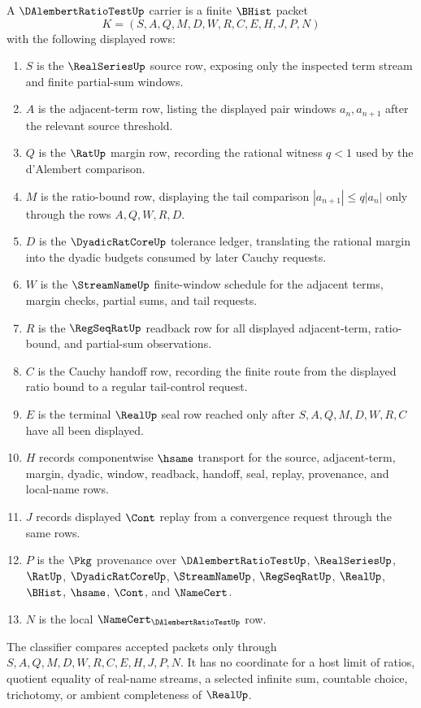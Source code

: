 \begin{definition}
\label{def:dalembert-ratio-test-carrier}
A $\DAlembertRatioTestUp$ carrier is a finite $\BHist$ packet
$$
K=(S,A,Q,M,D,W,R,C,E,H,J,P,N)
$$
with the following displayed rows:
\begin{enumerate}
\item $S$ is the $\RealSeriesUp$ source row, exposing only the inspected term stream and finite partial-sum windows.
\item $A$ is the adjacent-term row, listing the displayed pair windows $a_n,a_{n+1}$ after the relevant source threshold.
\item $Q$ is the $\RatUp$ margin row, recording the rational witness $q<1$ used by the d'Alembert comparison.
\item $M$ is the ratio-bound row, displaying the tail comparison $|a_{n+1}| \leq q|a_n|$ only through the rows $A,Q,W,R,D$.
\item $D$ is the $\DyadicRatCoreUp$ tolerance ledger, translating the rational margin into the dyadic budgets consumed by later Cauchy requests.
\item $W$ is the $\StreamNameUp$ finite-window schedule for the adjacent terms, margin checks, partial sums, and tail requests.
\item $R$ is the $\RegSeqRatUp$ readback row for all displayed adjacent-term, ratio-bound, and partial-sum observations.
\item $C$ is the Cauchy handoff row, recording the finite route from the displayed ratio bound to a regular tail-control request.
\item $E$ is the terminal $\RealUp$ seal row reached only after $S,A,Q,M,D,W,R,C$ have all been displayed.
\item $H$ records componentwise $\hsame$ transport for the source, adjacent-term, margin, dyadic, window, readback, handoff, seal, replay, provenance, and local-name rows.
\item $J$ records displayed $\Cont$ replay from a convergence request through the same rows.
\item $P$ is the $\Pkg$ provenance over $\DAlembertRatioTestUp$, $\RealSeriesUp$, $\RatUp$, $\DyadicRatCoreUp$, $\StreamNameUp$, $\RegSeqRatUp$, $\RealUp$, $\BHist$, $\hsame$, $\Cont$, and $\NameCert$.
\item $N$ is the local $\NameCert_{\DAlembertRatioTestUp}$ row.
\end{enumerate}
The classifier compares accepted packets only through $S,A,Q,M,D,W,R,C,E,H,J,P,N$. It has no coordinate for a host limit of ratios, quotient equality of real-name streams, a selected infinite sum, countable choice, trichotomy, or ambient completeness of $\RealUp$.
\end{definition}

